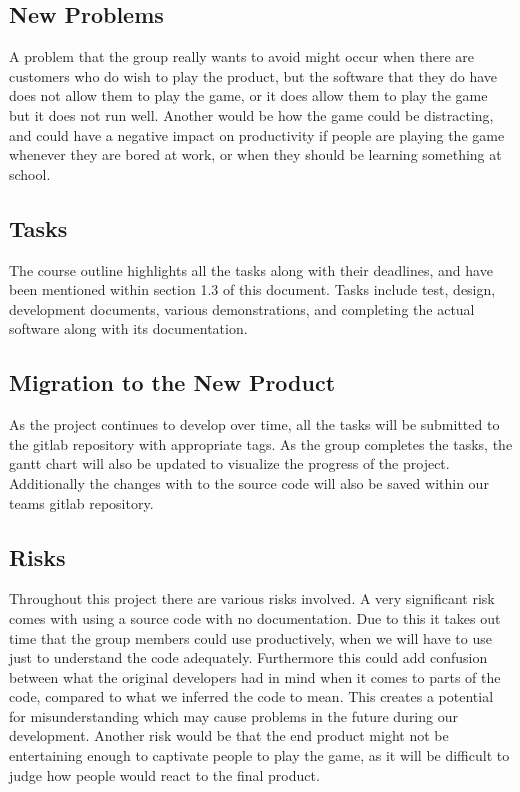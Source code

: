 \documentclass[12pt, titlepage]{article}
\begin{document}
\subsection{New Problems}

A problem that the group really wants to avoid might occur when there are customers who do wish to play the product, but the software that they do have does not allow them to play the game, or it does allow them to play the game but it does not run well. Another would be how the game could be distracting, and could have a negative impact on productivity if people are playing the game whenever they are bored at work, or when they should be learning something at school. 


\subsection{Tasks}

The course outline highlights all the tasks along with their deadlines, and have been mentioned within section 1.3 of this document. Tasks include test, design, development documents, various demonstrations, and completing the actual software along with its documentation. 

\subsection{Migration to the New Product}

As the project continues to develop over time, all the tasks will be submitted to the gitlab repository with appropriate tags. As the group completes the tasks, the gantt chart will also be updated to visualize the progress of the project. Additionally the changes with to the source code will also be saved within our teams gitlab repository. 

\subsection{Risks}

Throughout this project there are various risks involved. A very significant risk comes with using a source code with no documentation. Due to this it takes out time that the group members could use productively, when we will have to use just to understand the code adequately. Furthermore this could add confusion between what the original developers had in mind when it comes to parts of the code, compared to what we inferred the code to mean. This creates a potential for misunderstanding which may cause problems in the future during our development. Another risk would be that the end product might not be entertaining enough to captivate people to play the game, as it will be difficult to judge how people would react to the final product. 
\end{document}
